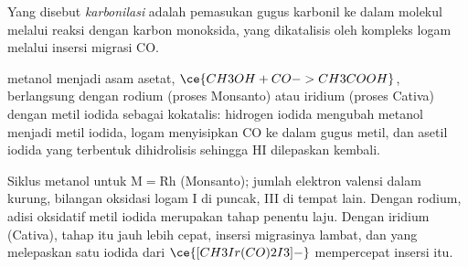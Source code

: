 \begin{definition}[Karbonilasi]\label{def:b3:homogeneous-catalysis:carbonylation}
Yang disebut \emph{karbonilasi} adalah pemasukan gugus karbonil
ke dalam molekul melalui reaksi dengan karbon monoksida, yang dikatalisis oleh kompleks logam
melalui insersi migrasi CO.
\end{definition}

 metanol menjadi asam asetat, $\ce{CH3OH + CO -> CH3COOH}$, berlangsung dengan
rodium (proses Monsanto) atau iridium (proses Cativa) dengan metil iodida
sebagai kokatalis: hidrogen iodida mengubah metanol menjadi metil iodida, logam
menyisipkan CO ke dalam gugus metil, dan asetil iodida yang terbentuk dihidrolisis
sehingga HI dilepaskan kembali.

\begin{omfigure}

{\small Siklus  metanol untuk $\mathrm M = \mathrm{Rh}$ (Monsanto); jumlah elektron
valensi dalam kurung, bilangan oksidasi logam I di puncak, III di tempat lain.
Dengan rodium, adisi oksidatif metil iodida merupakan tahap penentu laju. Dengan
iridium (Cativa), tahap itu jauh lebih cepat, insersi migrasinya lambat, dan
 yang melepaskan satu iodida dari $\ce{[CH3Ir(CO)2I3]-}$ mempercepat insersi itu.}
\end{omfigure}

